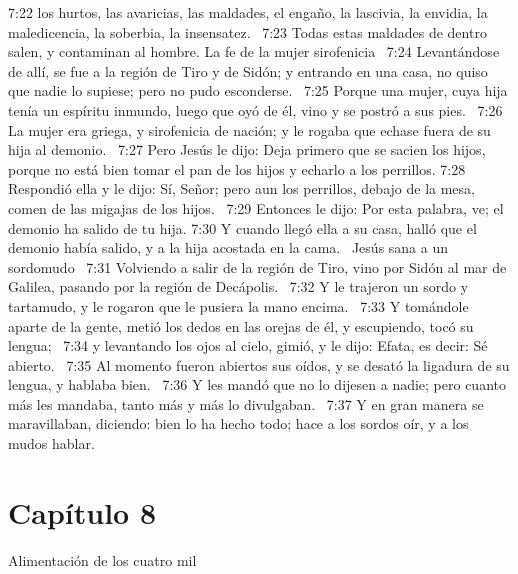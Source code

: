7:22 los hurtos, las avaricias, las maldades, el engaño, la lascivia, la envidia, la maledicencia, la soberbia, la insensatez.  
7:23 Todas estas maldades de dentro salen, y contaminan al hombre. 
La fe de la mujer sirofenicia   
7:24 Levantándose de allí, se fue a la región de Tiro y de Sidón; y entrando en una casa, no quiso que nadie lo supiese; pero no pudo esconderse.  
7:25 Porque una mujer, cuya hija tenía un espíritu inmundo, luego que oyó de él, vino y se postró a sus pies.  
7:26 La mujer era griega, y sirofenicia de nación; y le rogaba que echase fuera de su hija al demonio.  
7:27 Pero Jesús le dijo: Deja primero que se sacien los hijos, porque no está bien tomar el pan de los hijos y echarlo a los perrillos. 
7:28 Respondió ella y le dijo: Sí, Señor; pero aun los perrillos, debajo de la mesa, comen de las migajas de los hijos.  
7:29 Entonces le dijo: Por esta palabra, ve; el demonio ha salido de tu hija. 
7:30 Y cuando llegó ella a su casa, halló que el demonio había salido, y a la hija acostada en la cama.  
Jesús sana a un sordomudo  
7:31 Volviendo a salir de la región de Tiro, vino por Sidón al mar de Galilea, pasando por la región de Decápolis.  
7:32 Y le trajeron un sordo y tartamudo, y le rogaron que le pusiera la mano encima.  
7:33 Y tomándole aparte de la gente, metió los dedos en las orejas de él, y escupiendo, tocó su lengua;  
7:34 y levantando los ojos al cielo, gimió, y le dijo: Efata, es decir: Sé abierto.  
7:35 Al momento fueron abiertos sus oídos, y se desató la ligadura de su lengua, y hablaba bien.  
7:36 Y les mandó que no lo dijesen a nadie; pero cuanto más les mandaba, tanto más y más lo divulgaban.  
7:37 Y en gran manera se maravillaban, diciendo: bien lo ha hecho todo; hace a los sordos oír, y a los mudos hablar.  
\section*{Capítulo 8}
Alimentación de los cuatro mil   

